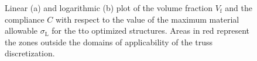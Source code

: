 \begin{figure}
    \hspace*{\fill}
    \hfill
    \hspace*{\fill}
    \caption{Linear (a) and logarithmic (b) plot of the volume fraction $V_\text{f}$ and the compliance $C$ with respect to the value of the maximum material allowable $\sigma_\text{L}$ for the \gls{tto} optimized structures. Areas in red represent the zones outside the domains of applicability of the truss discretization.}
    \label{fig:03_tto_plot}
\end{figure}

